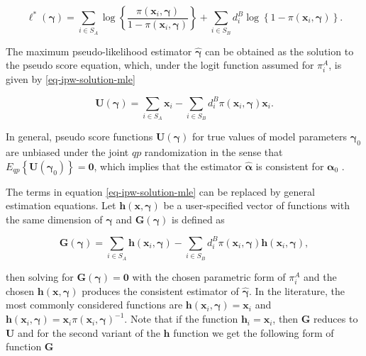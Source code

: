 \documentclass[
]{jss}
\begin{document}
\begin{equation}
\ell^*(\boldsymbol{\gamma}) = \sum_{i \in S_{A}} \log \left\{\frac{\pi\left(\boldsymbol{x}_i, \boldsymbol{\gamma}\right)}{1-\pi\left(\boldsymbol{x}_i, \boldsymbol{\gamma}\right)}\right\}+ \sum_{i \in S_{B}} d_i^B \log \left\{1-\pi\left(\boldsymbol{x}_i, \boldsymbol{\gamma}\right)\right\}.
\label{eq-ipw-pseudo-loglik}
\end{equation}

The maximum pseudo-likelihood estimator \(\hat{\boldsymbol{\gamma}}\)
can be obtained as the solution to the pseudo score equation, which,
under the logit function assumed for \(\pi_i^A\), is given by
\eqref{eq-ipw-solution-mle}

\begin{equation}
\boldsymbol{U}(\boldsymbol{\gamma}) = \sum_{i \in S_A} \boldsymbol{x}_i - \sum_{i \in S_B} d_i^B \pi(\boldsymbol{x}_i, \boldsymbol{\gamma}) \boldsymbol{x}_i.
\label{eq-ipw-solution-mle}
\end{equation}

In general, pseudo score functions
\(\boldsymbol{U}(\boldsymbol{\gamma})\) for true values of model
parameters \(\boldsymbol{\gamma}_0\) are unbiased under the joint
\(q p\) randomization in the sense that
\(E_{q p}\left\{\boldsymbol{U}\left(\boldsymbol{\gamma}_0\right)\right\}=\boldsymbol{0}\),
which implies that the estimator \(\hat{\boldsymbol{\alpha}}\) is
consistent for \(\boldsymbol{\alpha}_0\) \citep{wu2022statistical}.

The terms in equation \eqref{eq-ipw-solution-mle} can be replaced by
general estimation equations. Let
\(\boldsymbol{h}(\boldsymbol{x}, \boldsymbol{\gamma})\) be a
user-specified vector of functions with the same dimension of
\(\boldsymbol{\gamma}\) and \(\boldsymbol{G}(\boldsymbol{\gamma})\) is
defined as

\begin{equation}
\label{gee}
\boldsymbol{G}(\boldsymbol{\gamma})=\sum_{i \in S_A} \boldsymbol{h}\left(\boldsymbol{x}_i, \boldsymbol{\gamma}\right)-\sum_{i \in S_B} d_i^B \pi\left(\boldsymbol{x}_i, \boldsymbol{\gamma}\right) \boldsymbol{h}\left(\boldsymbol{x}_i, \boldsymbol{\gamma}\right),
\end{equation}

then solving for \(\boldsymbol{G}(\boldsymbol{\gamma})=\boldsymbol{0}\)
with the chosen parametric form of \(\pi_i^A\) and the chosen
\(\boldsymbol{h}(\boldsymbol{x},\boldsymbol{\gamma})\) produces the
consistent estimator of \(\hat{\boldsymbol{\gamma}}\). In the
literature, the most commonly considered functions are
\(\boldsymbol{h}\left(\boldsymbol{x}_i, \boldsymbol{\gamma}\right) = \boldsymbol{x}_i\)
and
\(\boldsymbol{h}\left(\boldsymbol{x}_i, \boldsymbol{\gamma}\right) = \boldsymbol{x}_i \pi\left(\boldsymbol{x}_i, \boldsymbol{\gamma}\right)^{-1}\).
Note that if the function \(\boldsymbol{h}_i=\boldsymbol{x}_i\), then
\(\boldsymbol{G}\) reduces to \(\boldsymbol{U}\) and for the second
variant of the \(\boldsymbol{h}\) function we get the following form of
function \(\boldsymbol{G}\)
\end{document}
